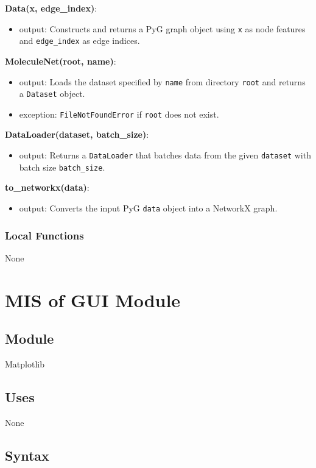 \documentclass[12pt, titlepage]{article}
\begin{document}
\textbf{Data(x, edge\_index)}:
\begin{itemize}
  \item output: Constructs and returns a PyG graph object using \texttt{x} as node features and \texttt{edge\_index} as edge indices.
\end{itemize}

\textbf{MoleculeNet(root, name)}:
\begin{itemize}
  \item output: Loads the dataset specified by \texttt{name} from directory \texttt{root} and returns a \texttt{Dataset} object.
  \item exception: \texttt{FileNotFoundError} if \texttt{root} does not exist.
\end{itemize}

\textbf{DataLoader(dataset, batch\_size)}:
\begin{itemize}
  \item output: Returns a \texttt{DataLoader} that batches data from the given \texttt{dataset} with batch size \texttt{batch\_size}.
\end{itemize}

\textbf{to\_networkx(data)}:
\begin{itemize}
  \item output: Converts the input PyG \texttt{data} object into a NetworkX graph.
\end{itemize}

\subsubsection{Local Functions}
None


\section{MIS of GUI Module} \label{MatplotlibGUI}

\subsection{Module}
Matplotlib

\subsection{Uses}
None

\subsection{Syntax}
\end{document}
